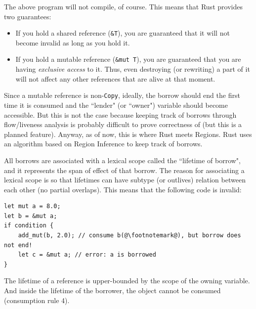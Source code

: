 \documentclass[11pt]{report}
\begin{document}
The above program will not compile, of course. This means that Rust provides two guarantees:

\begin{itemize}
\item If you hold a shared reference (\texttt{\&T}), you are guaranteed that it will not become invalid as long as you hold it.\footnotemark
\item If you hold a mutable reference (\texttt{\&mut T}), you are guaranteed that you are having \textit{exclusive access} to it. Thus, even destroying (or rewriting) a part of it will not affect any other references that are alive at that moment.
\end{itemize}

Since a mutable reference is non-\texttt{Copy}, ideally, the borrow should end the first time it is consumed and the ``lender" (or ``owner") variable should become accessible. But this is not the case because keeping track of borrows through flow/liveness analysis is probably difficult to prove correctness of (but this is a planned feature). Anyway, as of now, this is where Rust meets Regions. Rust uses an algorithm based on Region Inference to keep track of borrows.

All borrows are associated with a lexical scope called the ``lifetime of borrow", and it represents the span of effect of that borrow. The reason for associating a lexical scope is so that lifetimes can have subtype (or outlives) relation between each other (no partial overlaps). This means that the following code is invalid:

\begin{lstlisting}
let mut a = 8.0;
let b = &mut a;
if condition {
    add_mut(b, 2.0); // consume b(@\footnotemark@), but borrow does not end!
    let c = &mut a; // error: a is borrowed
}
\end{lstlisting}

The lifetime of a reference is upper-bounded by the scope of the owning variable. And inside the lifetime of the borrower, the object cannot be consumed (consumption rule 4).
\end{document}
